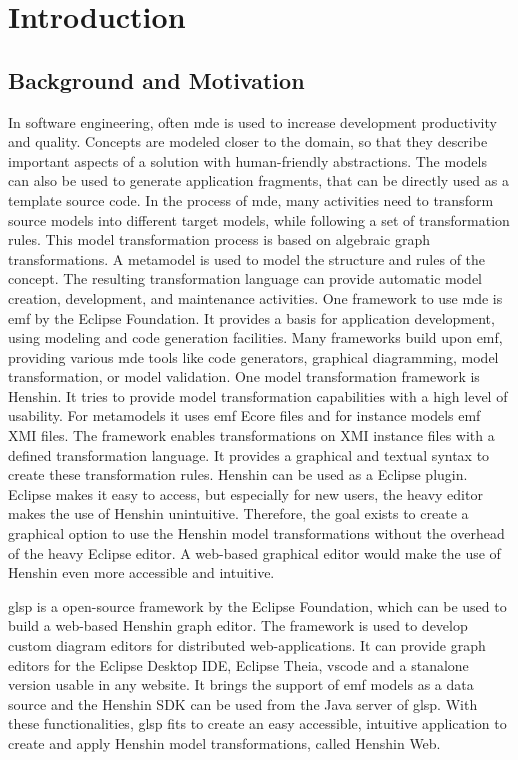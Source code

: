 \section{Introduction}
\label{sec:introduction}

\subsection{Background and Motivation}
\label{subsec:motivation}

In software engineering, often \ac{mde} is used to increase development productivity and quality. \cite{transformations-modeldriven} Concepts are modeled closer to the domain, so that they describe important aspects of a solution with human-friendly abstractions. The models can also be used to generate application fragments, that can be directly used as a template source code. In the process of \ac{mde}, many activities need to transform source models into different target models, while following a set of transformation rules. This model transformation process is based on algebraic graph transformations. A metamodel is used to model the structure and rules of the concept. The resulting transformation language can provide automatic model creation, development, and maintenance activities. \cite{transformations-modeldriven} One framework to use \ac{mde} is \ac{emf} by the Eclipse Foundation. It provides a basis for application development, using modeling and code generation facilities. Many frameworks build upon \ac{emf}, providing various \ac{mde} tools like code generators, graphical diagramming, model transformation, or model validation. \cite{emf} One model transformation framework is Henshin. \cite{henshin-repo} It tries to provide model transformation capabilities with a high level of usability. \cite{henshin-usability} For metamodels it uses \ac{emf} Ecore files and for instance models \ac{emf} XMI files. The framework enables transformations on XMI instance files with a defined transformation language. It provides a graphical and textual syntax to create these transformation rules. \cite{henshin-repo} Henshin can be used as a Eclipse plugin. Eclipse makes it easy to access, but especially for new users, the heavy editor makes the use of Henshin unintuitive.
Therefore, the goal exists to create a graphical option to use the Henshin model transformations without the overhead of the heavy Eclipse editor. A web-based graphical editor would make the use of Henshin even more accessible and intuitive.

\ac{glsp} is a open-source framework by the Eclipse Foundation, which can be used to build a web-based Henshin graph editor. The framework is used to develop custom diagram editors for distributed web-applications. \cite{glsp-repo} It can provide graph editors for the Eclipse Desktop IDE, Eclipse Theia, \ac{vscode} and a stanalone version usable in any website. It brings the support of \ac{emf} models as a data source and the Henshin SDK can be used from the Java server of \ac{glsp}. \cite{glsp-doc} With these functionalities, \ac{glsp} fits to create an easy accessible, intuitive application to create and apply Henshin model transformations, called Henshin Web.


